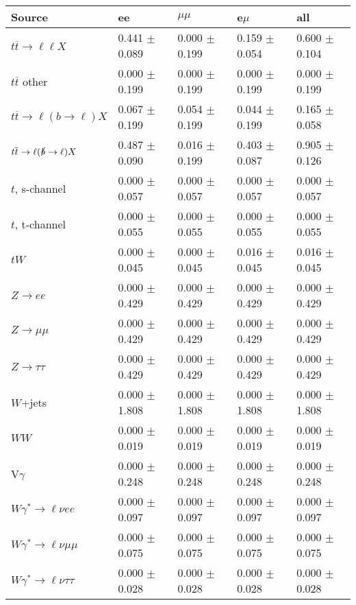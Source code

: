 \begin{tabular}{l | l l l l}
\hline\hline
 Source  &  ee  &  $\mu\mu$  &  e$\mu$  &  all \\
\hline
$t\overline{t}\rightarrow \ell\ell X$ &  0.441 $\pm$  0.089 &  0.000 $\pm$  0.199 &  0.159 $\pm$  0.054 &  0.600 $\pm$  0.104\\
$t\overline{t}$ other &  0.000 $\pm$  0.199 &  0.000 $\pm$  0.199 &  0.000 $\pm$  0.199 &  0.000 $\pm$  0.199\\
$t\overline{t}\rightarrow \ell(b\rightarrow \ell)X$ &  0.067 $\pm$  0.199 &  0.054 $\pm$  0.199 &  0.044 $\pm$  0.199 &  0.165 $\pm$  0.058\\
$t\overline{t}\rightarrow \ell(\slashed{b}\rightarrow \ell)X$ &  0.487 $\pm$  0.090 &  0.016 $\pm$  0.199 &  0.403 $\pm$  0.087 &  0.905 $\pm$  0.126\\
\hline
$t$, s-channel &  0.000 $\pm$  0.057 &  0.000 $\pm$  0.057 &  0.000 $\pm$  0.057 &  0.000 $\pm$  0.057\\
$t$, t-channel &  0.000 $\pm$  0.055 &  0.000 $\pm$  0.055 &  0.000 $\pm$  0.055 &  0.000 $\pm$  0.055\\
$tW$ &  0.000 $\pm$  0.045 &  0.000 $\pm$  0.045 &  0.016 $\pm$  0.045 &  0.016 $\pm$  0.045\\
\hline
$Z\rightarrow ee$ &  0.000 $\pm$  0.429 &  0.000 $\pm$  0.429 &  0.000 $\pm$  0.429 &  0.000 $\pm$  0.429\\
$Z\rightarrow\mu\mu$ &  0.000 $\pm$  0.429 &  0.000 $\pm$  0.429 &  0.000 $\pm$  0.429 &  0.000 $\pm$  0.429\\
$Z\rightarrow\tau\tau$ &  0.000 $\pm$  0.429 &  0.000 $\pm$  0.429 &  0.000 $\pm$  0.429 &  0.000 $\pm$  0.429\\
$W$+jets &  0.000 $\pm$  1.808 &  0.000 $\pm$  1.808 &  0.000 $\pm$  1.808 &  0.000 $\pm$  1.808\\
$WW$ &  0.000 $\pm$  0.019 &  0.000 $\pm$  0.019 &  0.000 $\pm$  0.019 &  0.000 $\pm$  0.019\\
\hline
V$\gamma$ &  0.000 $\pm$  0.248 &  0.000 $\pm$  0.248 &  0.000 $\pm$  0.248 &  0.000 $\pm$  0.248\\
$W\gamma^{*}\rightarrow\ell\nu e e$ &  0.000 $\pm$  0.097 &  0.000 $\pm$  0.097 &  0.000 $\pm$  0.097 &  0.000 $\pm$  0.097\\
$W\gamma^{*}\rightarrow\ell\nu\mu\mu$ &  0.000 $\pm$  0.075 &  0.000 $\pm$  0.075 &  0.000 $\pm$  0.075 &  0.000 $\pm$  0.075\\
$W\gamma^{*}\rightarrow\ell\nu\tau\tau$ &  0.000 $\pm$  0.028 &  0.000 $\pm$  0.028 &  0.000 $\pm$  0.028 &  0.000 $\pm$  0.028\\

\end{tabular}
